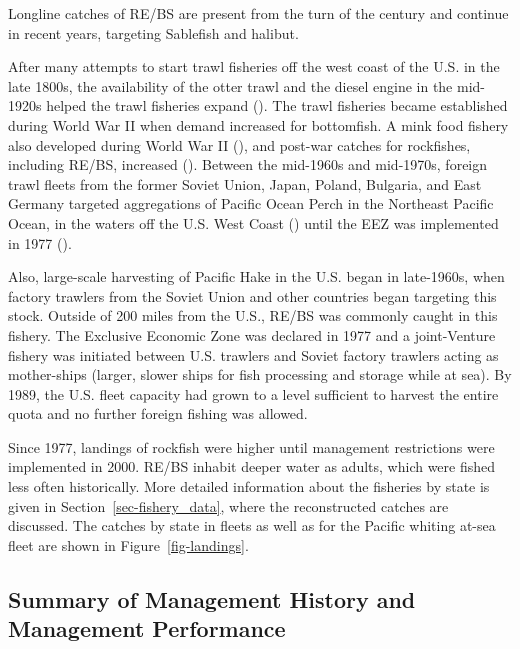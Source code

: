 \documentclass[
]{scrartcl}
\begin{document}
Longline catches of RE/BS are present from the turn of the century and
continue in recent years, targeting Sablefish and halibut.

After many attempts to start trawl fisheries off the west coast of the
U.S. in the late 1800s, the availability of the otter trawl and the
diesel engine in the mid-1920s helped the trawl fisheries expand
(). The
trawl fisheries became established during World War II when demand
increased for bottomfish. A mink food fishery also developed during
World War II (),
and post-war catches for rockfishes, including RE/BS, increased
(). Between the mid-1960s
and mid-1970s, foreign trawl fleets from the former Soviet Union, Japan,
Poland, Bulgaria, and East Germany targeted aggregations of Pacific
Ocean Perch in the Northeast Pacific Ocean, in the waters off the U.S.
West Coast () until the EEZ was implemented in 1977
().

Also, large-scale harvesting of Pacific Hake in the U.S. began in
late-1960s, when factory trawlers from the Soviet Union and other
countries began targeting this stock. Outside of 200 miles from the
U.S., RE/BS was commonly caught in this fishery. The Exclusive Economic
Zone was declared in 1977 and a joint-Venture fishery was initiated
between U.S. trawlers and Soviet factory trawlers acting as mother-ships
(larger, slower ships for fish processing and storage while at sea). By
1989, the U.S. fleet capacity had grown to a level sufficient to harvest
the entire quota and no further foreign fishing was allowed.

Since 1977, landings of rockfish were higher until management
restrictions were implemented in 2000. RE/BS inhabit deeper water as
adults, which were fished less often historically. More detailed
information about the fisheries by state is given in
Section~\ref{sec-fishery_data}, where the reconstructed catches are
discussed. The catches by state in fleets as well as for the Pacific
whiting at-sea fleet are shown in Figure~\ref{fig-landings}.

\subsection{Summary of Management History and Management
Performance}\label{summary-of-management-history-and-management-performance}
\end{document}
